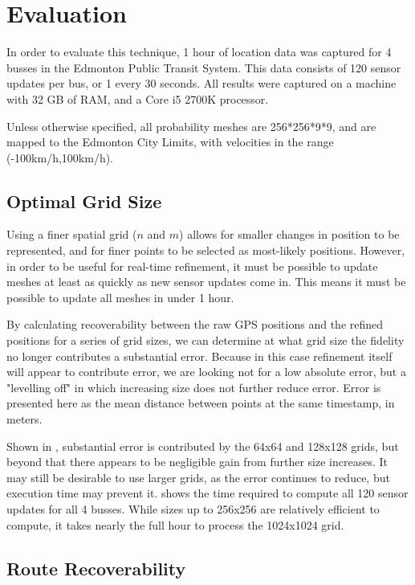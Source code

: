 \section{Evaluation}

In order to evaluate this technique, 1 hour of location data was captured for 4 busses in the Edmonton Public Transit System. This data consists of 120 sensor updates per bus, or 1 every 30 seconds. All results were captured on a machine with 32 GB of RAM, and a Core i5 2700K processor.

Unless otherwise specified, all probability meshes are 256*256*9*9, and are mapped to the Edmonton City Limits, with velocities in the range (-100km/h,100km/h).

\subsection{Optimal Grid Size}
Using a finer spatial grid ($n$ and $m$) allows for smaller changes in position to be represented, and for finer points to be selected as most-likely positions.
However, in order to be useful for real-time refinement, it must be possible to update meshes at least as quickly as new sensor updates come in. This means it must be possible to update all meshes in under 1 hour.

By calculating recoverability between the raw GPS positions and the refined positions for a series of grid sizes, we can determine at what grid size the fidelity no longer contributes a substantial error. Because in this case refinement itself will appear to contribute error, we are looking not for a low absolute error, but a "levelling off" in which increasing size does not further reduce error.
Error is presented here as the mean distance between points at the same timestamp, in meters.



Shown in , substantial error is contributed by the 64x64 and 128x128 grids, but beyond that there appears to be negligible gain from further size increases. It may still be desirable to use larger grids, as the error continues to reduce, but execution time may prevent it.  shows the time required to compute all 120 sensor updates for all 4 busses. While sizes up to 256x256 are relatively efficient to compute, it takes nearly the full hour to process the 1024x1024 grid.



\subsection{Route Recoverability}

